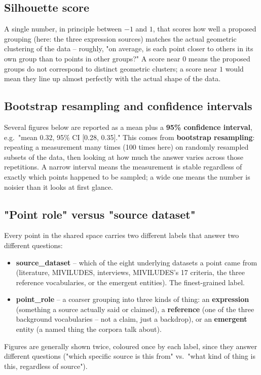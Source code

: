 \documentclass[11pt,a4paper]{article}
\newcommand{\jargon}[1]{\textbf{#1}}
\begin{document}
\subsection{Silhouette score}
A single number, in principle between $-1$ and $1$, that scores how well
a proposed grouping (here: the three expression sources) matches the
actual geometric clustering of the data -- roughly, "on average, is
each point closer to others in its own group than to points in other
groups?" A score near $0$ means the proposed groups do not correspond to
distinct geometric clusters; a score near $1$ would mean they line up
almost perfectly with the actual shape of the data.

\subsection{Bootstrap resampling and confidence intervals}
Several figures below are reported as a mean plus a \jargon{95\%
confidence interval}, e.g.\ "mean 0.32, 95\% CI [0.28, 0.35]." This
comes from \jargon{bootstrap resampling}: repeating a measurement many
times (100 times here) on randomly resampled subsets of the data, then
looking at how much the answer varies across those repetitions. A narrow
interval means the measurement is stable regardless of exactly which
points happened to be sampled; a wide one means the number is noisier
than it looks at first glance.

\subsection{"Point role" versus "source dataset"}
Every point in the shared space carries two different labels that
answer two different questions:
\begin{itemize}[leftmargin=1.4em]
  \item \jargon{source\_dataset} -- which of the eight underlying
  datasets a point came from (literature, MIVILUDES, interviews,
  MIVILUDES's 17 criteria, the three reference vocabularies, or the
  emergent entities). The finest-grained label.
  \item \jargon{point\_role} -- a coarser grouping into three kinds of
  thing: an \textbf{expression} (something a source actually said or
  claimed), a \textbf{reference} (one of the three background
  vocabularies -- not a claim, just a backdrop), or an
  \textbf{emergent} entity (a named thing the corpora talk about).
\end{itemize}
Figures are generally shown twice, coloured once by each label, since
they answer different questions ("which specific source is this from"
vs.\ "what kind of thing is this, regardless of source").
\end{document}
